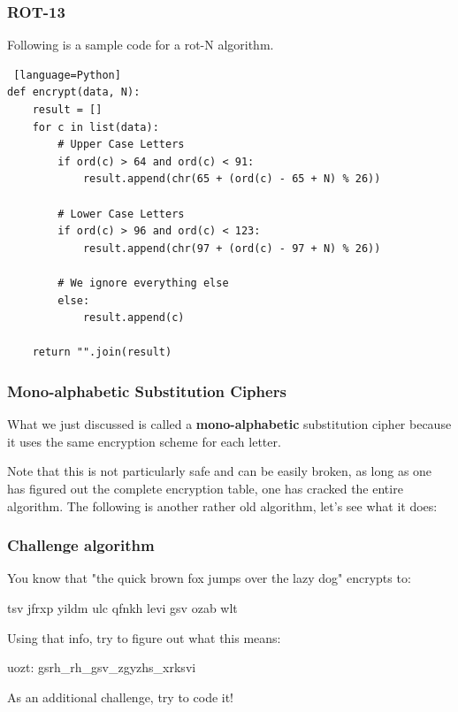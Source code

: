 \documentclass{beamer}
\begin{document}
\begin{frame}[fragile]
\frametitle{ROT-13}

Following is a sample code for a rot-N algorithm.

\begin{lstlisting} [language=Python]
def encrypt(data, N):
    result = []
    for c in list(data):
        # Upper Case Letters
        if ord(c) > 64 and ord(c) < 91:
            result.append(chr(65 + (ord(c) - 65 + N) % 26))

        # Lower Case Letters
        if ord(c) > 96 and ord(c) < 123:
            result.append(chr(97 + (ord(c) - 97 + N) % 26))

        # We ignore everything else
        else:
            result.append(c)

    return "".join(result)
\end{lstlisting}

\end{frame}

\begin{frame}
\frametitle{Mono-alphabetic Substitution Ciphers}
What we just discussed is called a \textbf{mono-alphabetic} substitution cipher
because it uses the same encryption scheme for each letter.

Note that this is not particularly safe and can be easily broken, as long as one
has figured out the complete encryption table, one has cracked the entire
algorithm. The following is another rather old algorithm, let's see what it
does:
\end{frame}

\begin{frame}
    \frametitle{Challenge algorithm}

    You know that "the quick brown fox jumps over the lazy dog" encrypts to:

    \begin{center}
     tsv jfrxp yildm ulc qfnkh levi gsv ozab wlt 
    \end{center}

    Using that info, try to figure out what this means:

    uozt: gsrh\_rh\_gsv\_zgyzhs\_xrksvi 

    As an additional challenge, try to code it!
\end{frame}
\end{document}

